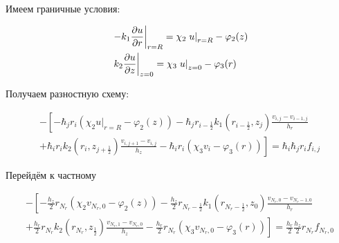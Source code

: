 Имеем граничные условия:

\begin{align*}
  &\left . -k_1 \pdv{u}{r} \right \vert_{r=R} = \chi_2 \left . u \right \vert_{r=R} - \varphi_2(z) \\
  &\left . k_2 \pdv{u}{z} \right \vert_{z=0} = \chi_3 \left . u \right \vert_{z=0} - \varphi_3(r) 
\end{align*}

Получаем разностную схему:

\begin{align*}
  - \left [ 
  -\hbar_j r_i (\chi_2 \left . u \right \vert_{r=R} - \varphi_2(z) )
  - \hbar_j r_{i-\frac{1}{2}} k_1(r_{i-\frac{1}{2}}, z_j) \frac{v_{i, j} - v_{i - 1, j}}{h_{r}}
  \right . \\
  \left .
  + \hbar_i r_{i} k_2(r_i, z_{j+\frac{1}{2}}) \frac{v_{i, j + 1} - v_{i, j}}{h_{z}}
  - \hbar_i r_i (\chi_3 v_i - \varphi_3(r))
  \right ]  = \hbar_i \hbar_j r_i f_{i, j}
\end{align*}

Перейдём к частному

\begin{align*}
  - \left [ 
  -\frac{h_z}{2} r_{N_r} (\chi_2 v_{N_r, 0} - \varphi_2(z) )
  - \frac{h_z}{2} r_{N_r-\frac{1}{2}} k_1(r_{N_r-\frac{1}{2}}, z_0) \frac{v_{N_r, 0} - v_{N_r - 1, 0}}{h_{r}}
  \right . \\
  \left .
  + \frac{h_r}{2} r_{N_r} k_2(r_{N_r}, z_{\frac{1}{2}}) \frac{v_{N_r, 1} - v_{N_r, 0}}{h_{z}}
  - \frac{h_r}{2} r_{N_r} (\chi_3 v_{N_r, 0} - \varphi_3(r))
  \right ]  = \frac{h_r}{2} \frac{h_z}{2} r_{N_r} f_{N_r, 0}
\end{align*}